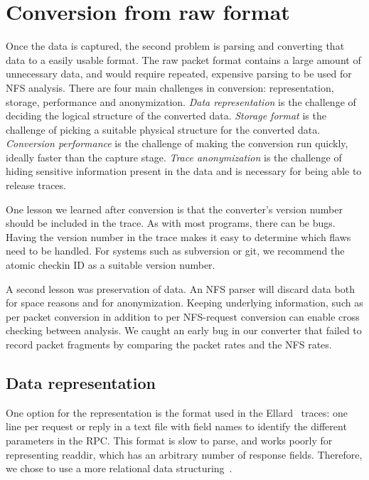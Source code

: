 \section{Conversion from raw format}
\label{sec:conversion}

Once the data is captured, the second problem is parsing and
converting that data to a easily usable format.  The raw packet format
contains a large amount of unnecessary data, and would require
repeated, expensive parsing to be used for NFS analysis.  There are four main
challenges in conversion: representation, storage, performance and
anonymization.  {\it Data representation} is the challenge of deciding the
logical structure of the converted data.  {\it Storage format} is the challenge of
picking a suitable physical structure for the converted data.
{\it Conversion performance} is the challenge of making the conversion run quickly,
ideally faster than the capture stage.  {\it Trace anonymization} is the
challenge of hiding sensitive information present in the data and is
necessary for being able to release traces.

One lesson we learned after conversion is that the converter's version
number should be included in the trace.  As with most programs, there
can be bugs.  Having the version number in the trace makes it easy to
determine which flaws need to be handled.  For systems such as
subversion or git, we recommend the atomic checkin ID as a suitable
version number.

A second lesson was
preservation of data.  An NFS parser will discard data both for space
reasons and for anonymization.  Keeping underlying information, such as
per packet conversion in addition to per NFS-request conversion can
enable cross checking between analysis.  We caught an early bug in our
converter that failed to record packet fragments by comparing the
packet rates and the NFS rates.  

\subsection{Data representation}

One option for the representation is the format used in the
Ellard~\cite{ellardTraces} traces: one line per request or reply in a text
file with field names to identify the different parameters in the RPC.
This format is slow to parse, and works poorly for representing 
readdir, which has an arbitrary number of response fields.
Therefore, we chose to use a more relational data
structuring~\cite{codd70relational}.  

